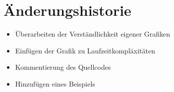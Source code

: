 \section*{Änderungshistorie}
    \begin{itemize}
        \item Überarbeiten der Verständlichkeit eigener Grafiken
        \item Einfügen der Grafik zu Laufzeitkompläxitäten
        \item Kommentierung des Quellcodes
        \item Hinzufügen eines Beispiels
    \end{itemize}
